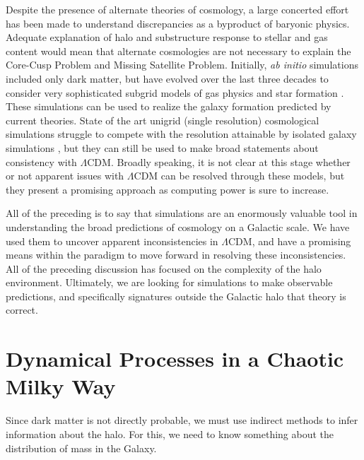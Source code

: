 Despite the presence of alternate theories of cosmology, a large concerted effort has been made to understand discrepancies as a byproduct of baryonic physics.  Adequate explanation of halo and substructure response to stellar and gas content would mean that alternate cosmologies are not necessary to explain the Core-Cusp Problem and Missing Satellite Problem. Initially, \textit{ab initio} simulations included only dark matter, but have evolved over the last three decades to consider very sophisticated subgrid models of gas physics and star formation \citep{LucySPH,CenOstriker92,KatzSPH96,SpringelMultiphase03,Stinson2006}.  These simulations can be used to realize the galaxy formation predicted by current theories. State of the art unigrid (single resolution) cosmological simulations struggle to compete with the resolution attainable by isolated galaxy simulations \citep{Illustris,Eagle}, but they can still be used to make broad statements about consistency with $\Lambda$CDM. Broadly speaking, it is not clear at this stage whether or not apparent issues with $\Lambda$CDM can be resolved through these models, but they present a promising approach as computing power is sure to increase.


All of the preceding is to say that simulations are an enormously valuable tool in understanding the broad predictions of cosmology on a Galactic scale. We have used them to uncover apparent inconsistencies in $\Lambda$CDM, and have a promising means within the paradigm to move forward in resolving these inconsistencies. All of the preceding discussion has focused on the complexity of the halo environment. Ultimately, we are looking for simulations to make observable predictions, and specifically signatures outside the Galactic halo that theory is correct.

\section{Dynamical Processes in a Chaotic Milky Way}

Since dark matter is not directly probable, we must use indirect methods to infer information about the halo. For this, we need to know something about the distribution of mass in the Galaxy.

